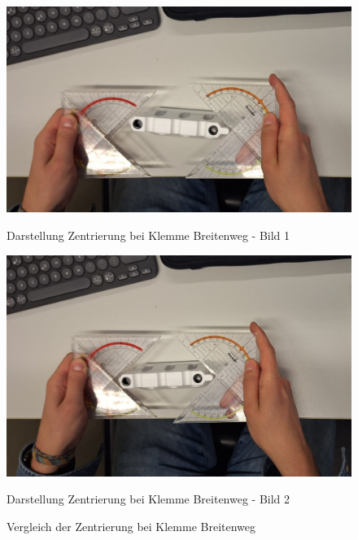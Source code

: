             \begin{figure}[h!]
                \centering
                \begin{minipage}{0.48\textwidth}
                    \centering
                    \includegraphics[width=\linewidth]{img/konzeptfindung/klemme_breitenweg_zentrierung_1.jpeg}
                    \caption{Darstellung Zentrierung bei Klemme Breitenweg - Bild 1}
                    \label{img:konzept_zentrierung_1}
                \end{minipage}
                \hfill
                \begin{minipage}{0.48\textwidth}
                    \centering
                    \includegraphics[width=\linewidth]{img/konzeptfindung/klemme_breitenweg_zentrierung_2.jpeg}
                    \caption{Darstellung Zentrierung bei Klemme Breitenweg - Bild 2}
                    \label{img:konzept_zentrierung_2}
                \end{minipage}
                \caption{Vergleich der Zentrierung bei Klemme Breitenweg}
            \end{figure}


